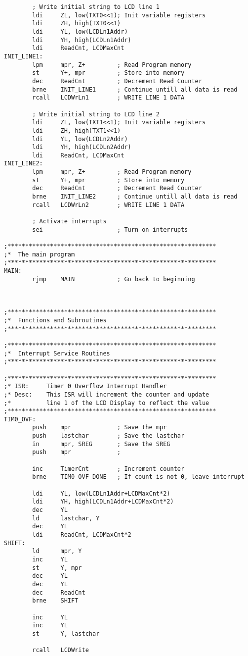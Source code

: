 \documentclass[12pt,letterpaper]{article}
\begin{document}
\begin{verbatim}
		; Write initial string to LCD line 1
		ldi		ZL, low(TXT0<<1); Init variable registers
		ldi		ZH, high(TXT0<<1)
		ldi		YL, low(LCDLn1Addr)
		ldi		YH, high(LCDLn1Addr)
		ldi		ReadCnt, LCDMaxCnt
INIT_LINE1:
		lpm		mpr, Z+			; Read Program memory
		st		Y+, mpr			; Store into memory
		dec		ReadCnt			; Decrement Read Counter
		brne	INIT_LINE1		; Continue untill all data is read
		rcall	LCDWrLn1		; WRITE LINE 1 DATA

		; Write initial string to LCD line 2
		ldi		ZL, low(TXT1<<1); Init variable registers
		ldi		ZH, high(TXT1<<1)
		ldi		YL, low(LCDLn2Addr)
		ldi		YH, high(LCDLn2Addr)
		ldi		ReadCnt, LCDMaxCnt
INIT_LINE2:
		lpm		mpr, Z+			; Read Program memory
		st		Y+, mpr			; Store into memory
		dec		ReadCnt			; Decrement Read Counter
		brne	INIT_LINE2		; Continue untill all data is read
		rcall	LCDWrLn2		; WRITE LINE 1 DATA

		; Activate interrupts
		sei						; Turn on interrupts

;***********************************************************
;*	The main program 
;***********************************************************
MAIN:
		rjmp	MAIN			; Go back to beginning



;***********************************************************
;*	Functions and Subroutines
;***********************************************************

;***********************************************************
;*	Interrupt Service Routines
;***********************************************************

;***********************************************************
;* ISR:		Timer 0 Overflow Interrupt Handler
;* Desc:	This ISR will increment the counter and update
;*			line 1 of the LCD Display to reflect the value
;***********************************************************
TIM0_OVF:
		push	mpr				; Save the mpr
		push	lastchar		; Save the lastchar
		in		mpr, SREG		; Save the SREG
		push	mpr				; 
		
		inc		TimerCnt		; Increment counter
		brne	TIM0_OVF_DONE	; If count is not 0, leave interrupt

		ldi		YL, low(LCDLn1Addr+LCDMaxCnt*2)
		ldi		YH, high(LCDLn1Addr+LCDMaxCnt*2)
		dec		YL
		ld		lastchar, Y
		dec		YL
		ldi		ReadCnt, LCDMaxCnt*2
SHIFT:
		ld		mpr, Y
		inc		YL
		st		Y, mpr
		dec		YL
		dec		YL
		dec		ReadCnt
		brne	SHIFT

		inc		YL
		inc		YL
		st		Y, lastchar

		rcall	LCDWrite


\end{verbatim}
\end{document}
